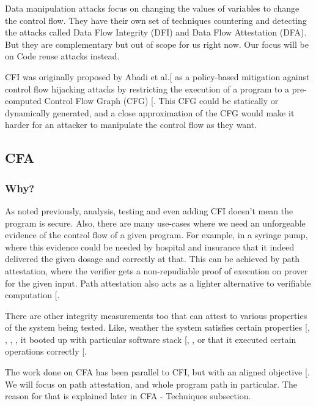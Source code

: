 \documentclass[a4paper, nobind]{templates/ociamthesis}
\begin{document}
Data manipulation attacks focus on changing the values of variables to change the control flow.
They have their own set of techniques countering and detecting the attacks called
Data Flow Integrity (DFI) and Data Flow Attestation (DFA). But they are complementary
but out of scope for us right now. Our focus will be on Code reuse attacks instead.

CFI was originally proposed by Abadi et al.{[}\citeproc{ref-abadi2009control}{1}{]} as a policy-based mitigation
against control flow hijacking attacks by restricting the execution of a program
to a pre-computed Control Flow Graph (CFG) {[}\citeproc{ref-sok}{5}{]}. This CFG could be statically or
dynamically generated, and a close approximation of the CFG would make it harder
for an attacker to manipulate the control flow as they want.

\subsection{CFA}\label{cfa}

\subsubsection{Why?}\label{why}

As noted previously, analysis, testing and even adding CFI doesn't mean the program is secure.
Also, there are many use-cases where we need an unforgeable evidence of the control flow
of a given program. For example, in a syringe pump, where this evidence could be
needed by hospital and insurance that it indeed delivered the given dosage and correctly at that.
This can be achieved by path attestation, where the verifier gets a non-repudiable
proof of execution on prover for the given input.
Path attestation also acts as a lighter alternative to verifiable computation {[}\citeproc{ref-walfish2015verifying}{55}{]}.

There are other integrity measurements too that can attest to various properties
of the system being tested.
Like, weather the system satisfies certain properties {[}, , , \citeproc{ref-sadeghi2004property}{47}{]},
it booted up with particular software stack {[}, \citeproc{ref-gasser1989digital}{27}{]},
or that it executed certain operations correctly {[}\citeproc{ref-sun2020oat}{53}{]}.

The work done on CFA has been parallel to CFI, but with an aligned objective {[}\citeproc{ref-sok}{5}{]}.
We will focus on path attestation, and whole program path in particular.
The reason for that is explained later in CFA - Techniques subsection.
\end{document}
